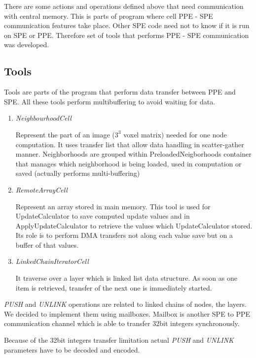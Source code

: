 
\par
There are some actions and operations defined above that need communication with central memory.
This is parts of program where cell PPE - SPE communication features take place.
Other SPE code need not to know if it is run on SPE or PPE.
Therefore set of tools that performs PPE - SPE communication was developed.

\subsection{Tools}
Tools are parts of the program that perform data transfer between PPE and SPE.
All these tools perform multibuffering to avoid waiting for data.

\begin{enumerate}
\item \emph{NeighbourhoodCell}
\par
Represent the part of an image ($3^3$ voxel matrix) needed for one node computation.
It uses transfer list that allow data handling in scatter-gather manner.
Neighborhoods are grouped within PreloadedNeigborhoods container that manages which neighborhood is being loaded, used in computation or saved (actually performs multi-buffering)

\item \emph{RemoteArrayCell}
\par
Represent an array stored in main memory.
This tool is used for UpdateCalculator to save computed update values and in ApplyUpdateCalculator to retrieve the values which UpdateCalculator stored.
Its role is to perform DMA transfers not along each value save but on a buffer of that values.

\item \emph{LinkedChainIteratorCell}
\par
It traverse over a layer which is linked list data structure.
As soon as one item is retrieved, transfer of the next one is immediately started.
\end{enumerate}

\par
\emph{PUSH} and \emph{UNLINK} operations are related to linked chains of nodes, the layers.
We decided to implement them using mailboxes.
Mailbox is another SPE to PPE communication channel which is able to transfer 32bit integers synchronously.

\par
Because of the 32bit integers transfer limitation actual \emph{PUSH} and \emph{UNLINK} parameters have to be decoded and encoded.

